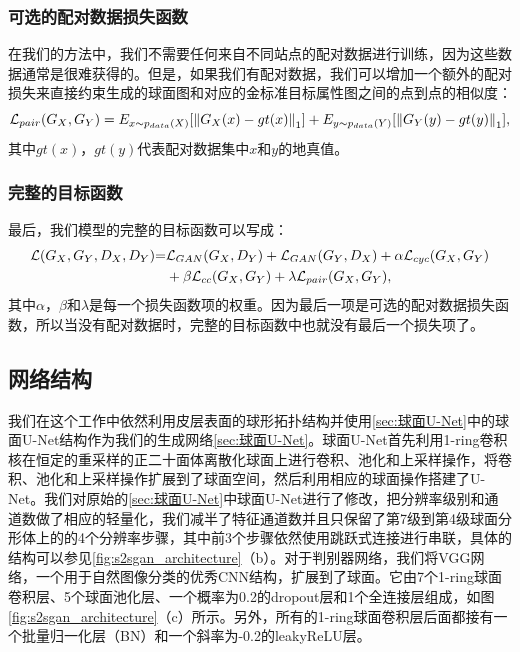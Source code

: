 \subsubsection{可选的配对数据损失函数}
在我们的方法中，我们不需要任何来自不同站点的配对数据进行训练，因为这些数据通常是很难获得的。但是，如果我们有配对数据，我们可以增加一个额外的配对损失来直接约束生成的球面图和对应的金标准目标属性图之间的点到点的相似度：
\begin{equation}
	{{\cal L}_{pair}}({G_X},{G_Y}) = {E_{x\sim{p_{data}}(X)}}[{\left\| {{G_X}(x) - gt(x)} \right\|_1}] + {E_{y\sim{p_{data}}(Y)}}[{\left\| {{G_Y}(y) - gt(y)} \right\|_1}],
\end{equation}
其中$gt(x)$，$gt(y)$代表配对数据集中$x$和$y$的地真值。
	
\subsubsection{完整的目标函数} 
最后，我们模型的完整的目标函数可以写成：
\begin{equation}
\begin{split}
    {\cal L}({G_X},{G_Y},{D_X},{D_Y}){\rm{ = }} & {{\cal L}_{GAN}}({G_X},{D_Y}) + {{\cal L}_{GAN}}({G_Y},{D_X}) + \alpha {{\cal L}_{cyc}}({G_X},{G_Y})  \\
    & +\beta {{\cal L}_{cc}}({G_X},{G_Y}) + \lambda {{\cal L}_{pair}}({G_X},{G_Y}),
\end{split}
\end{equation}
其中$\alpha$，$\beta$和$\lambda$是每一个损失函数项的权重。因为最后一项是可选的配对数据损失函数，所以当没有配对数据时，完整的目标函数中也就没有最后一个损失项了。
	
\subsection{网络结构}
我们在这个工作中依然利用皮层表面的球形拓扑结构并使用\ref{sec:球面U-Net}中的球面U-Net结构作为我们的生成网络\ref{sec:球面U-Net}。球面U-Net首先利用1-ring卷积核在恒定的重采样的正二十面体离散化球面上进行卷积、池化和上采样操作，将卷积、池化和上采样操作扩展到了球面空间，然后利用相应的球面操作搭建了U-Net。我们对原始的\ref{sec:球面U-Net}中球面U-Net进行了修改，把分辨率级别和通道数做了相应的轻量化，我们减半了特征通道数并且只保留了第7级到第4级球面分形体上的的4个分辨率步骤，其中前3个步骤依然使用跳跃式连接进行串联，具体的结构可以参见\ref{fig:s2sgan_architecture}（b）。对于判别器网络，我们将VGG\cite{simonyan2014very}网络，一个用于自然图像分类的优秀CNN结构，扩展到了球面。它由7个1-ring球面卷积层、5个球面池化层、一个概率为0.2的dropout层和1个全连接层组成，如图\ref{fig:s2sgan_architecture}（c）所示。另外，所有的1-ring球面卷积层后面都接有一个批量归一化层（BN）和一个斜率为-0.2的leakyReLU层。

